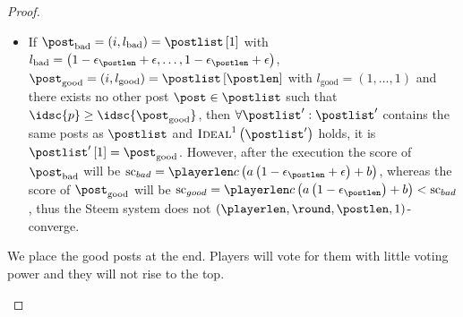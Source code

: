 \begin{proof}
\begin{itemize}
\begin{itemize}
      \item If $\post_\mathrm{bad} = \left(i, l_\mathrm{bad}\right) =
      \postlist\left[1\right]$ with $l_\mathrm{bad} = \left(1 -
      \epsilon_\postlen + \epsilon, \dots, 1 - \epsilon_\postlen +
      \epsilon\right)$, $\post_\mathrm{good} = \left(i, l_\mathrm{good}\right) =
      \postlist\left[\postlen\right]$ with $l_\mathrm{good} = \left(1, \dots,
      1\right)$ and there exists no other post $\post \in \postlist$ such that
      $\idsc{p} \geq \idsc{\post_\mathrm{good}}$, then $\forall \postlist':
      \postlist'$ contains the same posts as $\postlist$ and
      $\textsc{Ideal}^1\left(\postlist'\right)$ holds, it is
      $\postlist'\left[1\right] = \post_\mathrm{good}$. However, after the
      execution the score of $\post_\mathrm{bad}$ will be $\mathrm{sc}_{bad} =
      \playerlen c \left(a \left(1 - \epsilon_\postlen + \epsilon\right) +
      b\right)$, whereas the score of $\post_\mathrm{good}$ will be
      $\mathrm{sc}_{good} = \playerlen c \left(a \left(1 -
      \epsilon_\postlen\right) + b\right) < \mathrm{sc}_{bad}$, thus the Steem
      system does not $\left(\playerlen, \round, \postlen, 1\right)$-converge.
    \end{itemize}
    We place the
    good posts at the end. Players will vote for them with little voting power
    and they will not rise to the top.
  \end{itemize}
\end{proof}
